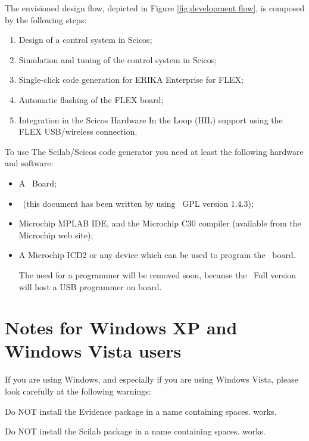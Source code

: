 The envisioned design flow, depicted in Figure \ref{fig:development
flow}, is composed by the following steps:
\begin{enumerate}
\item Design of a control system in Scicos;
\item Simulation and tuning of the control system in Scicos;
\item Single-click code generation for ERIKA Enterprise for FLEX;
\item Automatic flashing of the FLEX board;
\item Integration in the Scicos Hardware In the Loop (HIL) support
  using the FLEX USB/wireless connection.
\end{enumerate}

To use The Scilab/Scicos code generator you need at least the
following hardware and software:
\begin{itemize}
\item A \flex\ Board;
\item \ee\ (this document has been written by using \ee\ GPL version 1.4.3);
\item Microchip MPLAB IDE, and the Microchip C30 compiler (available
  from the Microchip web site);
\item A Microchip ICD2 or any device which can be used to program the
  \flex\ board.
  \begin{note}
    The need for a programmer will be removed soon, because the \flex\
    Full version will host a USB programmer on board.
  \end{note}
\end{itemize}

\chapter{Notes for Windows XP and Windows Vista users}
\label{ch:vista}

If you are using Windows, and especially if you are using Windows
Vista, please look carefully at the following warnings:

\begin{warning}
Do NOT install the Evidence package in a name containing spaces.
\file{c:/Evidence/Evidence} works.
\end{warning}

\begin{warning}
Do NOT install the Scilab package in a name containing spaces.
 works.
\end{warning}

